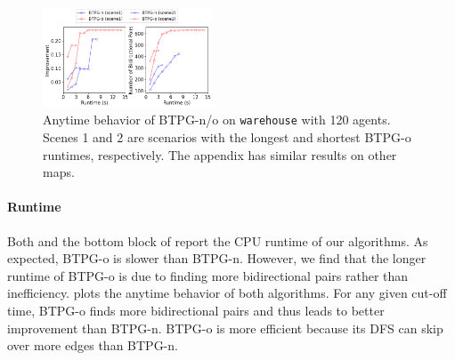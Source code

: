 \documentclass[letterpaper]{article} %
\theoremstyle{definition}
\begin{document}


\begin{figure}[t!]
    \centering
    \includegraphics[width=0.45\textwidth]{Figs/anytime_warehouse.png}
    \caption{Anytime behavior of BTPG-n/o on \texttt{warehouse} with 120 agents. Scenes 1 and 2 are scenarios with the longest and shortest BTPG-o runtimes, respectively. The appendix has similar results on other maps.}
    \label{fig:anytime}
\end{figure}

\paragraph{Runtime}
Both  and the bottom block of  report the CPU runtime of our algorithms. As expected, BTPG-o is slower than BTPG-n. %
However, we find that the longer runtime of BTPG-o is due to finding more bidirectional pairs rather than inefficiency.  plots the anytime behavior of both algorithms. For any given cut-off time, BTPG-o finds more bidirectional pairs and thus leads to better improvement than BTPG-n. BTPG-o is more efficient because its DFS can skip over more edges than BTPG-n.

\end{document}
